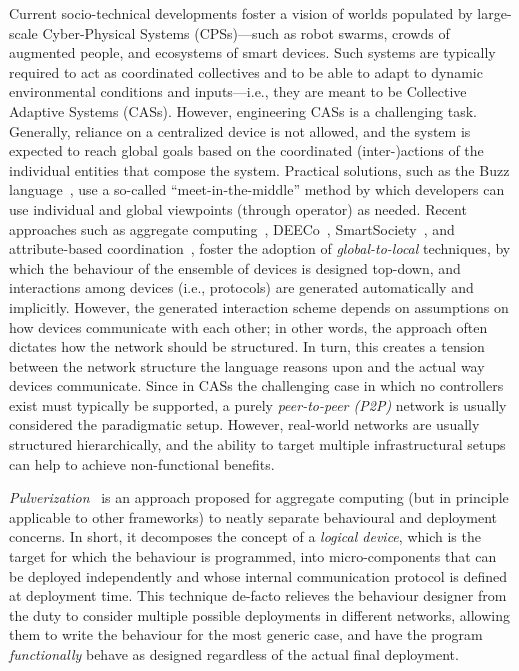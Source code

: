 Current socio-technical developments
 foster a vision of worlds
 populated by large-scale Cyber-Physical Systems (CPSs)---such as robot swarms, 
 crowds of augmented people, and 
 ecosystems of smart devices.
%
Such systems are typically required 
 to act as coordinated collectives
 and to be able to adapt to dynamic
 environmental conditions and inputs---i.e., they are meant to be Collective Adaptive Systems (CASs).
%
However, engineering CASs is a challenging task.
%
Generally, reliance on a centralized device is not allowed,
and the system is expected to reach global goals based 
 on the coordinated (inter-)actions of the individual entities that compose the system.
Practical solutions, such as the Buzz language~\cite{DBLP:journals/computer/PinciroliB16}, use a so-called ``meet-in-the-middle'' method by which developers can use individual and global viewpoints (through  operator) as needed.
%
Recent approaches such as aggregate computing~\cite{DBLP:journals/computer/BealPV15,DBLP:journals/jlap/ViroliBDACP19}, 
 DEECo~\cite{DBLP:conf/cbse/BuresGHKKP13},
 SmartSociety~\cite{DBLP:conf/soca/ScekicMSDHCTRCD15},
 and attribute-based coordination~\cite{DBLP:journals/scp/AlrahmanNL20},
foster the adoption of \emph{global-to-local} techniques,
by which the behaviour of the ensemble of devices is designed top-down,
and interactions among devices (i.e., protocols) are generated automatically and implicitly.
%
However, the generated interaction scheme depends on assumptions on how devices communicate with each other;
in other words, the approach often dictates how the network should be structured.
%
In turn, this creates a tension between the network structure the language reasons upon and the actual way devices communicate.
%
Since in CASs the challenging case in which no controllers exist must typically be supported, a purely \emph{peer-to-peer (P2P)} network is usually considered the paradigmatic setup.
%
However, real-world networks are usually structured hierarchically, and the ability to target multiple infrastructural setups can help to achieve non-functional benefits.

\emph{Pulverization}~\cite{DBLP:journals/fi/CasadeiPPVW20}
is an approach proposed for aggregate computing (but in principle applicable to other frameworks) to neatly separate behavioural and deployment concerns.
%
In short, it decomposes the concept of a \emph{logical device}, which is the target for which the behaviour is programmed,
into micro-components that can be deployed independently
and whose internal communication protocol is defined at deployment time.
%
This technique de-facto relieves the behaviour designer from the duty to consider multiple possible deployments in different networks,
allowing them to write the behaviour for the most generic case, and have the program \emph{functionally} behave as designed regardless of the actual final deployment.


